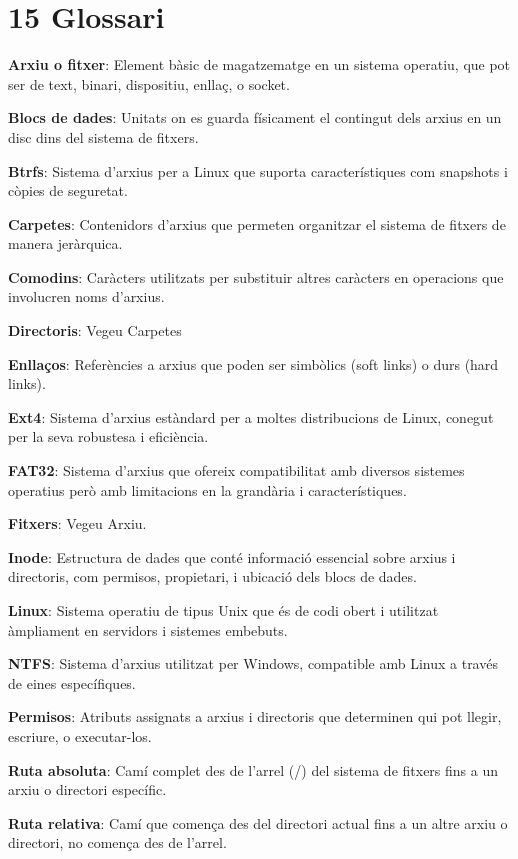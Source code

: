 \documentclass[
  12 pt,
  a4paper,
]{article}
\begin{document}
\section{15 Glossari}\label{glossari}

\textbf{Arxiu o fitxer}: Element bàsic de magatzematge en un sistema
operatiu, que pot ser de text, binari, dispositiu, enllaç, o socket.

\textbf{Blocs de dades}: Unitats on es guarda físicament el contingut
dels arxius en un disc dins del sistema de fitxers.

\textbf{Btrfs}: Sistema d'arxius per a Linux que suporta
característiques com snapshots i còpies de seguretat.

\textbf{Carpetes}: Contenidors d'arxius que permeten organitzar el
sistema de fitxers de manera jeràrquica.

\textbf{Comodins}: Caràcters utilitzats per substituir altres caràcters
en operacions que involucren noms d'arxius.

\textbf{Directoris}: Vegeu Carpetes

\textbf{Enllaços}: Referències a arxius que poden ser simbòlics (soft
links) o durs (hard links).

\textbf{Ext4}: Sistema d'arxius estàndard per a moltes distribucions de
Linux, conegut per la seva robustesa i eficiència.

\textbf{FAT32}: Sistema d'arxius que ofereix compatibilitat amb diversos
sistemes operatius però amb limitacions en la grandària i
característiques.

\textbf{Fitxers}: Vegeu Arxiu.

\textbf{Inode}: Estructura de dades que conté informació essencial sobre
arxius i directoris, com permisos, propietari, i ubicació dels blocs de
dades.

\textbf{Linux}: Sistema operatiu de tipus Unix que és de codi obert i
utilitzat àmpliament en servidors i sistemes embebuts.

\textbf{NTFS}: Sistema d'arxius utilitzat per Windows, compatible amb
Linux a través de eines específiques.

\textbf{Permisos}: Atributs assignats a arxius i directoris que
determinen qui pot llegir, escriure, o executar-los.

\textbf{Ruta absoluta}: Camí complet des de l'arrel (/) del sistema de
fitxers fins a un arxiu o directori específic.

\textbf{Ruta relativa}: Camí que comença des del directori actual fins a
un altre arxiu o directori, no comença des de l'arrel.
\end{document}
